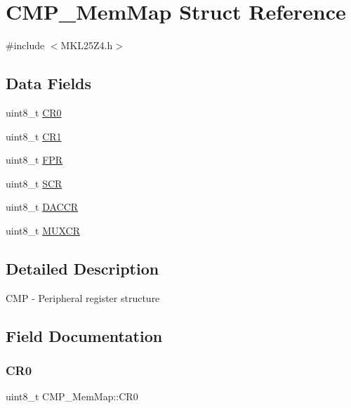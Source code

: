 \hypertarget{struct_c_m_p___mem_map}{}\section{C\+M\+P\+\_\+\+Mem\+Map Struct Reference}
\label{struct_c_m_p___mem_map}


{\ttfamily \#include $<$M\+K\+L25\+Z4.\+h$>$}

\subsection*{Data Fields}
\begin{DoxyCompactItemize}
\item 
uint8\+\_\+t \hyperlink{struct_c_m_p___mem_map_ad56a4dbaba4426c89e4d9b256173ab84}{C\+R0}
\item 
uint8\+\_\+t \hyperlink{struct_c_m_p___mem_map_ab790f5d18ef53ba0c9cfc2b5f3ce6668}{C\+R1}
\item 
uint8\+\_\+t \hyperlink{struct_c_m_p___mem_map_aa793447f43fa77759b6eaf1620bed4bc}{F\+PR}
\item 
uint8\+\_\+t \hyperlink{struct_c_m_p___mem_map_a3fe55f0243869b50fc54acb9c194d970}{S\+CR}
\item 
uint8\+\_\+t \hyperlink{struct_c_m_p___mem_map_a64ad86546fe53058b6fdd5ca1252f7c2}{D\+A\+C\+CR}
\item 
uint8\+\_\+t \hyperlink{struct_c_m_p___mem_map_a3b48de300c4b4116ebb942659a2948a2}{M\+U\+X\+CR}
\end{DoxyCompactItemize}


\subsection{Detailed Description}
C\+MP -\/ Peripheral register structure 

\subsection{Field Documentation}
\mbox{\label{struct_c_m_p___mem_map_ad56a4dbaba4426c89e4d9b256173ab84}} 
\subsubsection{\texorpdfstring{C\+R0}{CR0}}
{\footnotesize\ttfamily uint8\+\_\+t C\+M\+P\+\_\+\+Mem\+Map\+::\+C\+R0}

